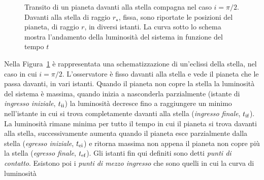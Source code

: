 \begin{figure}
  \centering
  \caption[Transito di un pianeta davanti alla stella compagna nel caso
  $i =
  \pi/2$]{Transito di un pianeta davanti alla stella compagna nel caso $i =
    \pi/2$. Davanti alla stella di raggio $r_\star$, fissa, sono riportate le
    posizioni del pianeta, di raggio $r$, in diversi istanti. La curva sotto lo
    schema mostra l'andamento della luminosità del sistema in funzione del tempo
    $t$}
  \label{fig:schema-transito}
\end{figure}
Nella Figura~\ref{fig:schema-transito} è rappresentata una schematizzazione di
un'eclissi della stella, nel caso in cui $i = \pi/2$. L'osservatore è fisso
davanti alla stella e vede il pianeta che le passa davanti, in vari
istanti. Quando il pianeta non copre la stella la luminosità del sistema è
massima, quando inizia a nasconderla parzialmente (istante di
\emph{ingresso iniziale}, $t_{\textup{ii}}$) la luminosità decresce fino a
raggiungere un minimo nell'istante in cui si trova completamente davanti alla
stella (\emph{ingresso finale}, $t_{\textup{if}}$). La luminosità rimane minima
per tutto il tempo in cui il pianeta si trova davanti alla stella,
successivamente aumenta quando il pianeta esce parzialmente dalla stella
(\emph{egresso iniziale}, $t_{\textup{ei}}$) e ritorna massima non appena il
pianeta non copre più la stella (\emph{egresso finale}, $t_{\textup{ef}}$). Gli
istanti fin qui definiti sono detti \emph{punti di contatto}. Esistono poi i
\emph{punti di mezzo ingresso} che sono quelli in cui la curva di luminosità
